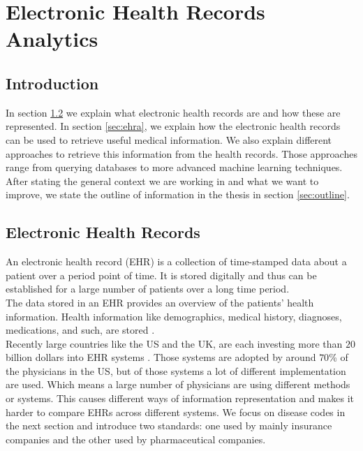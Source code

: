 \graphicspath{ {Context/Images/} }


\chapter{Electronic Health Records Analytics}
\label{cha:context}

\section{Introduction}

In section \ref{sec:ehr} we explain what electronic health records are and how these are represented. In section \ref{sec:ehra}, we explain how the electronic health records can be used to retrieve useful medical information. We also explain different approaches to retrieve this information from the health records. Those approaches range from querying databases to more advanced machine learning techniques. After stating the general context we are working in and what we want to improve, we state the outline of information in the thesis in section \ref{sec:outline}.


\section{Electronic Health Records}
\label{sec:ehr}

An electronic health record (EHR) is a collection of time-stamped data about a patient over a period point of time. It is stored digitally and thus can be established for a large number of patients over a long time period. \\
The data stored in an EHR provides an overview of the patients' health information. Health information like demographics, medical history, diagnoses, medications, and such, are stored \cite{HealthIT:online}. \\

Recently large countries like the US and the UK, are each investing more than $20$ billion dollars into EHR systems \cite{EHRworld:article}. Those systems are adopted by around $70$\% of the physicians in the US, but of those systems a lot of different implementation are used. Which means a large number of physicians are using different methods or systems. This causes different ways of information representation and makes it harder to compare EHRs across different systems. We focus on disease codes in the next section and introduce two standards: one used by mainly insurance companies and the other used by pharmaceutical companies. 


